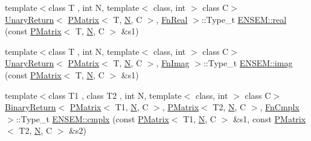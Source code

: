 \begin{DoxyCompactItemize}
\item 
{\footnotesize template$<$class T , int N, template$<$ class, int $>$ class C$>$ }\\\mbox{\hyperlink{structENSEM_1_1UnaryReturn}{Unary\+Return}}$<$ \mbox{\hyperlink{classENSEM_1_1PMatrix}{P\+Matrix}}$<$ T, \mbox{\hyperlink{adat__devel_2lib_2hadron_2operator__name__util_8cc_a7722c8ecbb62d99aee7ce68b1752f337}{N}}, C $>$, \mbox{\hyperlink{structENSEM_1_1FnReal}{Fn\+Real}} $>$\+::Type\+\_\+t \mbox{\hyperlink{group__primmatrix_ga5d6f44c46b47f8dc972b40a518058e0e}{E\+N\+S\+E\+M\+::real}} (const \mbox{\hyperlink{classENSEM_1_1PMatrix}{P\+Matrix}}$<$ T, \mbox{\hyperlink{adat__devel_2lib_2hadron_2operator__name__util_8cc_a7722c8ecbb62d99aee7ce68b1752f337}{N}}, C $>$ \&s1)
\item 
{\footnotesize template$<$class T , int N, template$<$ class, int $>$ class C$>$ }\\\mbox{\hyperlink{structENSEM_1_1UnaryReturn}{Unary\+Return}}$<$ \mbox{\hyperlink{classENSEM_1_1PMatrix}{P\+Matrix}}$<$ T, \mbox{\hyperlink{adat__devel_2lib_2hadron_2operator__name__util_8cc_a7722c8ecbb62d99aee7ce68b1752f337}{N}}, C $>$, \mbox{\hyperlink{structENSEM_1_1FnImag}{Fn\+Imag}} $>$\+::Type\+\_\+t \mbox{\hyperlink{group__primmatrix_ga0e708a122654c3ad8295f071a5857abb}{E\+N\+S\+E\+M\+::imag}} (const \mbox{\hyperlink{classENSEM_1_1PMatrix}{P\+Matrix}}$<$ T, \mbox{\hyperlink{adat__devel_2lib_2hadron_2operator__name__util_8cc_a7722c8ecbb62d99aee7ce68b1752f337}{N}}, C $>$ \&s1)
\item 
{\footnotesize template$<$class T1 , class T2 , int N, template$<$ class, int $>$ class C$>$ }\\\mbox{\hyperlink{structENSEM_1_1BinaryReturn}{Binary\+Return}}$<$ \mbox{\hyperlink{classENSEM_1_1PMatrix}{P\+Matrix}}$<$ T1, \mbox{\hyperlink{adat__devel_2lib_2hadron_2operator__name__util_8cc_a7722c8ecbb62d99aee7ce68b1752f337}{N}}, C $>$, \mbox{\hyperlink{classENSEM_1_1PMatrix}{P\+Matrix}}$<$ T2, \mbox{\hyperlink{adat__devel_2lib_2hadron_2operator__name__util_8cc_a7722c8ecbb62d99aee7ce68b1752f337}{N}}, C $>$, \mbox{\hyperlink{structENSEM_1_1FnCmplx}{Fn\+Cmplx}} $>$\+::Type\+\_\+t \mbox{\hyperlink{group__primmatrix_ga895c61e14c8d4206a949f44e36add5c6}{E\+N\+S\+E\+M\+::cmplx}} (const \mbox{\hyperlink{classENSEM_1_1PMatrix}{P\+Matrix}}$<$ T1, \mbox{\hyperlink{adat__devel_2lib_2hadron_2operator__name__util_8cc_a7722c8ecbb62d99aee7ce68b1752f337}{N}}, C $>$ \&s1, const \mbox{\hyperlink{classENSEM_1_1PMatrix}{P\+Matrix}}$<$ T2, \mbox{\hyperlink{adat__devel_2lib_2hadron_2operator__name__util_8cc_a7722c8ecbb62d99aee7ce68b1752f337}{N}}, C $>$ \&s2)

\end{DoxyCompactItemize}
